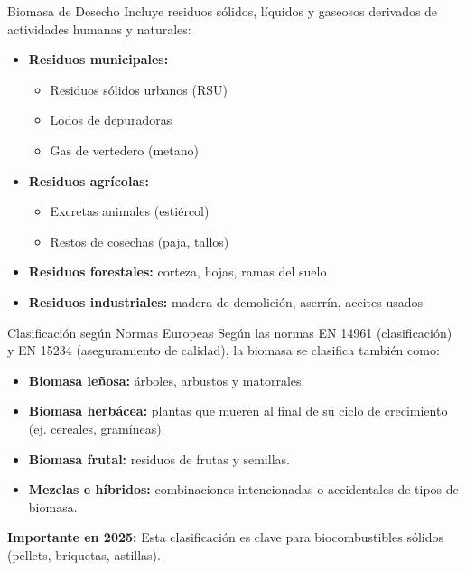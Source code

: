 \documentclass[../../main.tex]{subfiles}
\begin{document}
\begin{frame}{Biomasa de Desecho}
\justifying
Incluye residuos sólidos, líquidos y gaseosos derivados de actividades humanas y naturales:

\begin{itemize}
  \item \textbf{Residuos municipales:}
    \begin{itemize}
      \item Residuos sólidos urbanos (RSU)
      \item Lodos de depuradoras
      \item Gas de vertedero (metano)
    \end{itemize}
  \item \textbf{Residuos agrícolas:}
    \begin{itemize}
      \item Excretas animales (estiércol)
      \item Restos de cosechas (paja, tallos)
    \end{itemize}
  \item \textbf{Residuos forestales:} corteza, hojas, ramas del suelo
  \item \textbf{Residuos industriales:} madera de demolición, aserrín, aceites usados
\end{itemize}
\end{frame}


\begin{frame}{Clasificación según Normas Europeas}
\justifying
Según las normas EN 14961 (clasificación) y EN 15234 (aseguramiento de calidad), la biomasa se clasifica también como:

\begin{itemize}
  \item \textbf{Biomasa leñosa:} árboles, arbustos y matorrales.
  \item \textbf{Biomasa herbácea:} plantas que mueren al final de su ciclo de crecimiento (ej. cereales, gramíneas).
  \item \textbf{Biomasa frutal:} residuos de frutas y semillas.
  \item \textbf{Mezclas e híbridos:} combinaciones intencionadas o accidentales de tipos de biomasa.
\end{itemize}

\vspace{1em}
\textbf{Importante en 2025:} Esta clasificación es clave para biocombustibles sólidos (pellets, briquetas, astillas).
\end{frame}
\end{document}
